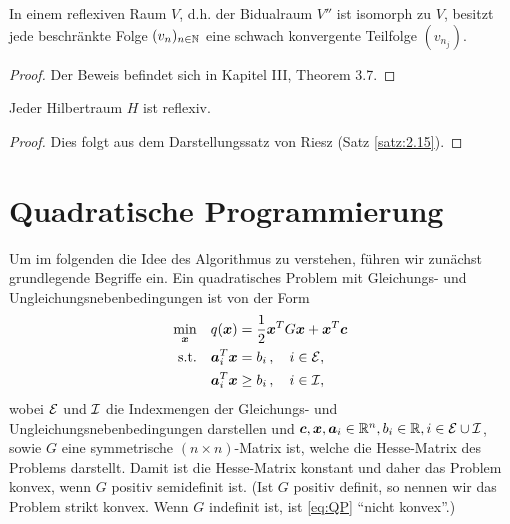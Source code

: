 \begin{theorem}\label{theorem:A.14}
In einem reflexiven Raum $V$, d.h. der Bidualraum $V''$ ist isomorph zu $V$, besitzt jede beschränkte Folge $(v_n)_{n\in \mathbb{N}}$ eine schwach konvergente Teilfolge $(v_{n_j})$.
\end{theorem}

\begin{proof}
Der Beweis befindet sich in \cite{Werner} Kapitel III, Theorem 3.7.
\end{proof}

\begin{bem}\label{bem:A.15}
Jeder Hilbertraum $H$ ist reflexiv.
\end{bem}

\begin{proof}
Dies folgt aus dem Darstellungssatz von Riesz (Satz \ref{satz:2.15}).
\end{proof}










\label{anhang:B}

\section{Quadratische Programmierung}
\label{anhang:B.1}

Um im folgenden die Idee des Algorithmus zu verstehen, führen wir zunächst grundlegende Begriffe ein. Ein quadratisches Problem mit Gleichungs- und Ungleichungsnebenbedingungen ist von der Form
\begin{align}\label{eq:QP}
\begin{aligned}
	\min_{\boldsymbol x} & \quad q(\boldsymbol x) = \frac 1 2 \boldsymbol x^T G\boldsymbol x + \boldsymbol x^T \boldsymbol c \\
	\text{s.t.} & \quad \boldsymbol a_i^T \boldsymbol x = b_i \, , \quad i \in \mathcal E, \\
	& \quad \boldsymbol a_i^T \boldsymbol x\ge b_i \, , \quad i \in \mathcal I,
\end{aligned}
\end{align}
wobei $\mathcal E$ und $ \mathcal I$ die Indexmengen der Gleichungs- und Ungleichungsnebenbedingungen darstellen und $\boldsymbol c,\boldsymbol x,\boldsymbol a_i \in \mathbb{R}^n, b_i \in \mathbb{R}, i \in \mathcal E \cup \mathcal I$, sowie $G$ eine symmetrische $(n\times n)$-Matrix ist, welche die Hesse-Matrix des Problems darstellt. Damit ist die Hesse-Matrix konstant und daher das Problem konvex, wenn $G$ positiv semidefinit ist. (Ist $G$ positiv definit, so nennen wir das Problem strikt konvex. Wenn $G$ indefinit ist, ist \eqref{eq:QP} "`nicht konvex"'.)


